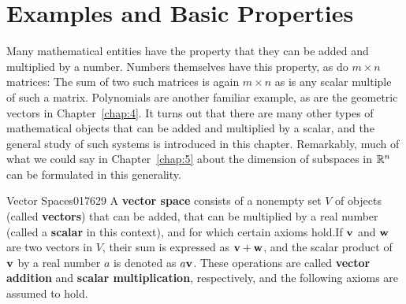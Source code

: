 \section{Examples and Basic Properties}
\label{sec:6_1}

Many mathematical entities have the property that they can be added and multiplied by a number. Numbers themselves have this property, as do $m \times n$ matrices: The sum of two such matrices is again $m \times n$ as is any scalar multiple of such a matrix. Polynomials are another familiar example, as are the geometric vectors in Chapter~\ref{chap:4}. It turns out that there are many other types of mathematical objects that can be added and multiplied by a scalar, and the general study of such systems is introduced in this chapter. Remarkably, much of what we could say in Chapter~\ref{chap:5} about the dimension of subspaces in $\mathbb{R}^n$ can be formulated in this generality.


\newpage
\begin{definition}{Vector Spaces}{017629}
A \textbf{vector space} consists of a nonempty set $V$ of objects (called \textbf{vectors}) that can be added, that can be multiplied by a real number (called a \textbf{scalar} in this context), and for which certain axioms hold.\footnotemark If $\textbf{v}$ and $\textbf{w}$ are two vectors in $V$, their sum is expressed as $\textbf{v} + \textbf{w}$, and the scalar product of $\textbf{v}$ by a real number $a$ is denoted as $a\textbf{v}$. These operations are called \textbf{vector addition} and \textbf{scalar multiplication}, respectively, and the following axioms are assumed to hold.
\end{definition}

